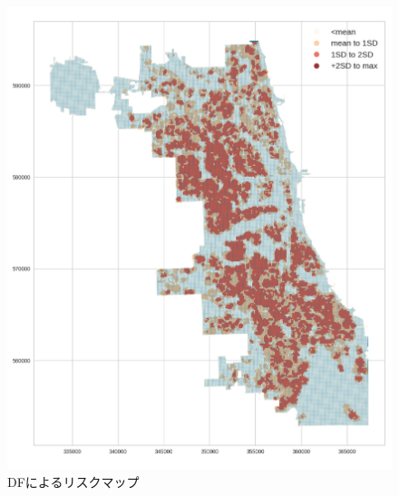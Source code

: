 \begin{figure}[H]
  \centering %
  \includegraphics[scale=0.15]{./figures/DF_riskmap.png}
  \caption{DFによるリスクマップ}
  \label{fig:non-crime-timeseries-df-risk}
\end{figure}

